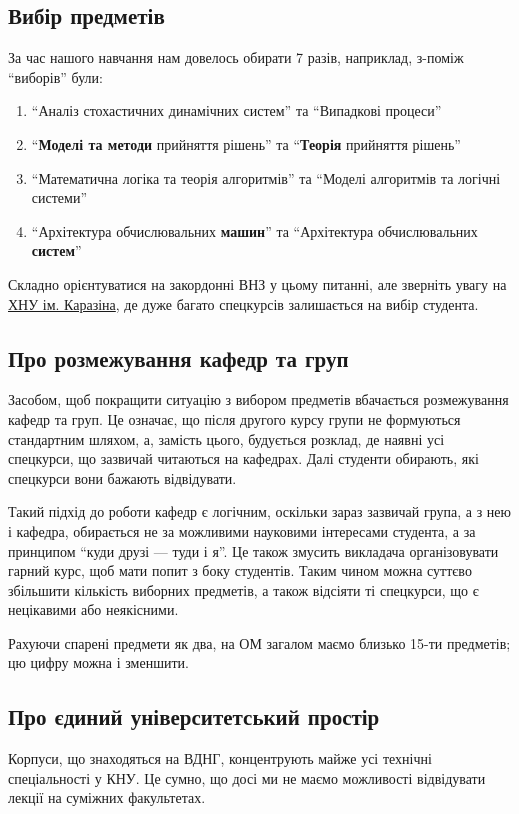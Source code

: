 \documentclass[14pt, a4paper]{extarticle}  %
\begin{document}
\subsection{Вибір предметів}
\label{real_choice}
За час нашого навчання нам довелось обирати 7 разів, наприклад, з-поміж ``виборів'' були:
\begin{enumerate}
    \item ``Аналіз стохастичних динамічних систем'' та ``Випадкові процеси''
    \item ``\textbf{Моделі та методи} прийняття рішень'' та ``\textbf{Теорія} прийняття рішень''
    \item  ``Математична логіка та теорія алгоритмів'' та ``Моделі алгоритмів та логічні системи''
    \item ``Архітектура обчислювальних \textbf{машин}'' та ``Архітектура обчислювальних \textbf{систем}''
\end{enumerate}

Складно орієнтуватися на закордонні ВНЗ у цьому питанні, але зверніть увагу на \href{http://appmath.univer.kharkov.ua/courses_new.html}{ХНУ ім. Каразіна}, де дуже багато спецкурсів залишається на вибір студента. %

\subsection{Про розмежування кафедр та груп}
\label{cathedra_demarcation}
Засобом, щоб покращити ситуацію з вибором предметів вбачається розмежування кафедр та груп. Це означає, що після другого курсу групи не формуються стандартним шляхом, а, замість цього, будується розклад, де наявні усі спецкурси, що зазвичай читаються на кафедрах. Далі студенти обирають, які спецкурси вони бажають відвідувати.

Такий підхід до роботи кафедр є логічним, оскільки зараз зазвичай група, а з нею і кафедра, обирається не за можливими науковими інтересами студента, а за принципом ``куди друзі --- туди і я''. Це також змусить викладача організовувати гарний курс, щоб мати попит з боку студентів. Таким чином можна суттєво збільшити кількість виборних предметів, а також відсіяти ті спецкурси, що є нецікавими або неякісними.

Рахуючи спарені предмети як два, на ОМ загалом маємо близько 15-ти предметів; цю цифру можна і зменшити. 

\subsection{Про єдиний університетський простір}
\label{common_space}
Корпуси, що знаходяться на ВДНГ, концентрують майже усі технічні спеціальності у КНУ. Це сумно, що досі ми не маємо можливості відвідувати лекції на суміжних факультетах. 
\end{document}

